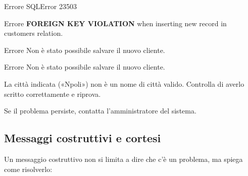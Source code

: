 \begin{center}
\begin{minipage}[t]{0.27\linewidth}\centering
  \begin{finestra}{Errore}
    SQLError 23503
  \end{finestra}\par\smallskip
  \begin{finestra}{Errore}
    \textbf{FOREIGN KEY VIOLATION} when inserting new record in customers relation.
  \end{finestra}\par\smallskip\male
\end{minipage}\hfill
\begin{minipage}[t]{0.27\linewidth}\centering
  \begin{finestra}{Errore}
    Non è stato possibile salvare il nuovo cliente.
  \end{finestra}\par\smallskip\male
\end{minipage}\hfill
\begin{minipage}[t]{0.36\linewidth}\centering
  \begin{finestra}{Errore}
    Non è stato possibile salvare il nuovo cliente.\par\smallskip
    La città indicata («Npoli») non è un nome di città valido. Controlla di averlo scritto correttamente e
    riprova.\par\smallskip
    Se il problema persiste, contatta l'amministratore del sistema.
  \end{finestra}\par\smallskip\bene
\end{minipage}
\end{center}

\subsection{Messaggi costruttivi e cortesi}

Un messaggio costruttivo non si limita a dire che c'è un problema, ma spiega come risolverlo:

